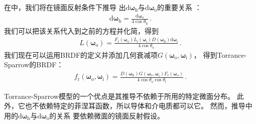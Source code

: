 在中，我们将在镜面反射条件下推导
出$\mathrm{d}{\bm\omega}_{\mathrm{h}}$与$\mathrm{d}{\bm\omega}_{\mathrm{o}}$的重要关系
：
\begin{align}\label{eq:8.17}
    \mathrm{d}{\bm\omega}_{\mathrm{h}}=\frac{\mathrm{d}{\bm\omega}_{\mathrm{o}}}{4\cos\theta_{\mathrm{h}}}\, .
\end{align}
我们可以把该关系代入到之前的方程并化简，得到
\begin{align*}
    L({\bm\omega}_{\mathrm{o}})=\frac{F_{\mathrm{r}}({\bm\omega}_{\mathrm{o}})
    L_{\mathrm{i}}({\bm\omega}_{\mathrm{i}})D({\bm\omega}_{\mathrm{h}})\mathrm{d}{\bm\omega}_{\mathrm{i}}}
    {4\cos\theta_{\mathrm{o}}}\, .
\end{align*}
我们现在可以运用BRDF的定义并添加几何衰减项$G({\bm\omega}_{\mathrm{o}},{\bm\omega}_{\mathrm{i}})$，
得到Torrance-Sparrow的BRDF：
\begin{align}\label{eq:8.18}
    f_{\mathrm{r}}({\bm\omega}_{\mathrm{o}},{\bm\omega}_{\mathrm{i}})=
    \frac{D({\bm\omega}_{\mathrm{h}})G({\bm\omega}_{\mathrm{o}},{\bm\omega}_{\mathrm{i}})
    F_{\mathrm{r}}({\bm\omega}_{\mathrm{o}})}{4\cos\theta_{\mathrm{o}}\cos\theta_{\mathrm{i}}}\, .
\end{align}

Torrance-Sparrow模型的一个优点是其推导不依赖于所用的特定微面分布。
此外，它也不依赖特定的菲涅耳函数，所以导体和介电质都可以它。
然而，推导中用的$\mathrm{d}{\bm\omega}_{\mathrm{h}}$与$\mathrm{d}{\bm\omega}_{\mathrm{o}}$的关系
要依赖微面的镜面反射假设。


